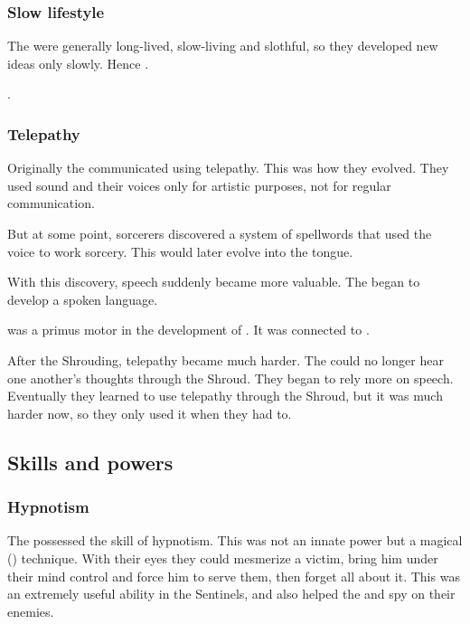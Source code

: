 \subsubsection{Slow lifestyle}
The \ophidians were generally long-lived, slow-living and slothful, so they developed new ideas only slowly. 
Hence .

\Sethicus {}. 





\subsubsection{Telepathy}
Originally the \ophidians{} communicated using telepathy. 
This was how they evolved. 
They used sound and their voices only for artistic purposes, not for regular communication. 

But at some point, \ophidian{} sorcerers discovered a system of spellwords that used the voice to work sorcery. 
This would later evolve into the  tongue. 

With this discovery, speech suddenly became more valuable. 
The \ophidians{} began to develop a spoken language. 

 was a primus motor in the development of \TrueDraconic. 
It was connected to . 

After the Shrouding, telepathy became much harder. 
The \ophidians could no longer hear one another's thoughts through the Shroud. 
They began to rely more on speech. 
Eventually they learned to use telepathy through the Shroud, but it was much harder now, so they only used it when they had to. 









\subsection{Skills and powers}





\subsubsection{Hypnotism}
The \ophidians possessed the skill of hypnotism.
This was not an innate power but a magical () technique. 
With their eyes they could mesmerize a victim, bring him under their mind control and force him to serve them, then forget all about it. 
This was an extremely useful ability in the Sentinels, and also helped the \ophidians {} and spy on their enemies. 

